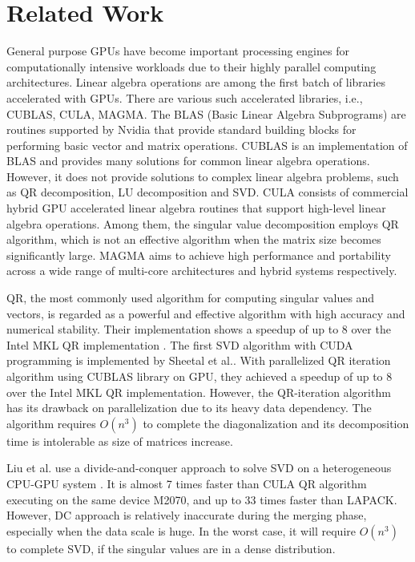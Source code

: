 \section{Related Work}
\label{sec:related}
General purpose GPUs have become important processing engines for computationally intensive workloads due to their highly parallel computing architectures.
Linear algebra operations are among the first batch of libraries accelerated with GPUs.
There are various such accelerated libraries, i.e.,  CUBLAS, CULA, MAGMA. The BLAS (Basic Linear Algebra Subprograms) are routines supported by Nvidia \cite{cublas} that provide standard building blocks for performing basic vector and matrix operations. CUBLAS is an implementation of BLAS and provides many solutions for common linear algebra operations. 
However, it does not provide solutions to complex linear algebra problems, such as QR decomposition, LU decomposition and SVD.
CULA consists of commercial hybrid GPU accelerated linear algebra routines\cite{cula} that support high-level linear algebra operations.
Among them, the singular value decomposition employs QR algorithm, which is not an effective algorithm when the matrix size becomes significantly large.
MAGMA aims to achieve high performance and portability across a wide range of multi-core architectures and hybrid systems respectively\cite{magma}.

QR, the most commonly used algorithm for computing singular values and vectors, 
is regarded as a powerful and effective algorithm with high accuracy
and numerical stability\cite{97bookalgebra}. 
Their implementation shows a speedup of up to 8 over the Intel MKL QR implementation \cite{mkl}.
The first SVD algorithm with CUDA programming is implemented by Sheetal et al.\cite{09IPDPSQR}. With parallelized QR iteration algorithm using CUBLAS library on GPU, they achieved a speedup of up to 8 over the Intel MKL QR implementation.
However, the QR-iteration algorithm has its drawback on parallelization due to its heavy data dependency.
The algorithm requires $O(n^3)$ to complete the diagonalization and its decomposition time is intolerable as size of matrices increase.

Liu et al. use a divide-and-conquer approach to solve SVD on a heterogeneous CPU-GPU system \cite{13CFDC}.
It is almost 7 times faster than CULA QR algorithm executing on the same device M2070, and up to 33 times faster than LAPACK.
However, DC approach is relatively inaccurate during the merging phase, especially when the data scale is huge.
In the worst case, it will require $O(n^3)$ to complete SVD, if the singular values are in a dense distribution\cite{97bookalgebra}.

